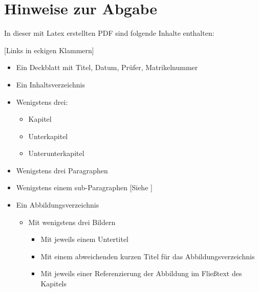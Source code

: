 \section*{Hinweise zur Abgabe} \label{chap:hinweise}

In dieser mit Latex erstellten PDF sind folgende Inhalte enthalten: 

[Links in eckigen Klammern]

\begin{itemize}
    \item Ein Deckblatt mit Titel, Datum, Prüfer, Matrikelnummer                               
    \item Ein Inhaltsverzeichnis      
    \item Wenigstens drei: 
        \begin{itemize}
            \item  Kapitel                                           
            \item  Unterkapitel                                                          
            \item  Unterunterkapitel
        \end{itemize}                                                                                                                   
    \item Wenigstens drei Paragraphen                                                           
    \item Wenigstens einem sub-Paragraphen                   [Siehe ]                                   
    \item Ein Abbildungsverzeichnis                                                             
    \begin{itemize}                                                                             
        \item Mit wenigstens drei Bildern                                                       
        \begin{itemize}                                                                         
            \item Mit jeweils einem Untertitel                                                  
            \item Mit einem abweichenden kurzen Titel für das Abbildungsverzeichnis             
            \item Mit jeweils einer Referenzierung der Abbildung im Fließtext des Kapitels      

\end{itemize}
\end{itemize}
\end{itemize}
